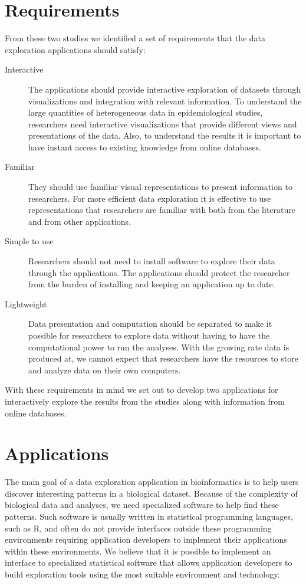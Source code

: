 \section{Requirements} 
From these two studies we identified a set of requirements that the data
exploration applications should satisfy: 

\begin{description} 
\item[Interactive] The applications should provide interactive exploration
    of datasets through visualizations and integration with relevant
    information. 
    To understand the large quantities of heterogeneous data in
    epidemiological studies, researchers need interactive visualizations
    that provide different views and presentations of the data. Also, to
    understand the results it is important to have instant access to
    existing knowledge from online databases. 
    
\item[Familiar] They should use familiar visual representations to present
    information to researchers. For more efficient data exploration it is 
    effective to use representations that researchers are familiar with both from
    the literature and from other applications. 
    
\item[Simple to use] Researchers should not need to install software to
    explore their data through the applications. The applications should 
    protect the researcher from the burden of installing and keeping an
    application up to date. 
    
\item[Lightweight] Data presentation and computation should be separated
    to make it possible for researchers to explore data without having to
    have the computational power to run the analyses. With the growing rate
    data is produced at, we cannot expect that researchers have the resources to
    store and analyze data on their own computers. 
    
\end{description}

With these requirements in mind we set out to develop two applications for
interactively explore the results from the studies along with information
from online databases. 

\section{Applications} 
The main goal of a data exploration application in bioinformatics is to help
users discover interesting patterns in a biological dataset. Because of the
complexity of biological data and analyses, we need specialized software to help
find these patterns. Such software is usually written in statistical programming
languages, such as R, and often do not provide interfaces outside these
programming environments requiring application developers to implement their
applications within these environments. We believe that it is possible to
implement an interface to specialized statistical software that allows
application developers to build exploration tools using the most suitable
environment and technology. 

